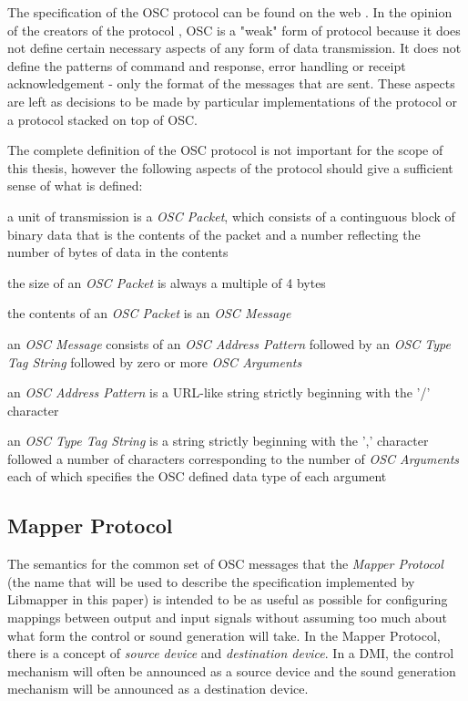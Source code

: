 The specification of the OSC protocol can be found on the web \cite{osc2011}. In the opinion of the creators of the protocol \cite{osc2009}, OSC is a "weak" form of protocol because it does not define certain necessary aspects of any form of data transmission. It does not define the patterns of command and response, error handling or receipt acknowledgement - only the format of the messages that are sent. These aspects are left as decisions to be made by particular implementations of the protocol or a protocol stacked on top of OSC.

The complete definition of the OSC protocol is not important for the scope of this thesis, however the following aspects of the protocol should give a sufficient sense of what is defined:

\begin{description}
\item a unit of transmission is a \emph{OSC Packet}, which consists of a continguous block of binary data that is the contents of the packet and a number reflecting the number of bytes of data in the contents
\item the size of an \emph{OSC Packet} is always a multiple of 4 bytes
\item the contents of an \emph{OSC Packet} is an \emph{OSC Message}
\item an \emph{OSC Message} consists of an \emph{OSC Address Pattern} followed by an \emph{OSC Type Tag String} followed by zero or more \emph{OSC Arguments}
\item an \emph{OSC Address Pattern} is a URL-like string strictly beginning with the '/' character
\item an \emph{OSC Type Tag String} is a string strictly beginning with the ',' character followed a number of characters corresponding to the number of \emph{OSC Arguments} each of which specifies the OSC defined data type of each argument
\end{description}

\subsection{Mapper Protocol}

The semantics for the common set of OSC messages that the \emph{Mapper Protocol} (the name that will be used to describe the specification implemented by Libmapper in this paper) is intended to be as useful as possible for configuring mappings between output and input signals without assuming too much about what form the control or sound generation will take. In the Mapper Protocol, there is a concept of \emph{source device} and \emph{destination device}. In a DMI, the control mechanism will often be announced as a source device and the sound generation mechanism will be announced as a destination device. 

